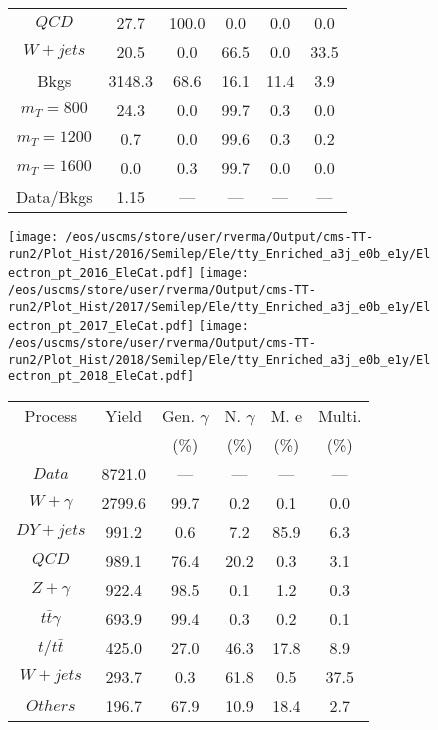 \begin{figure}
\begin{minipage}[c]{0.32\textwidth}
{\begin{tabular}{cccccc}
$ QCD $ &  27.7 &  100.0 &  0.0 &  0.0 &  0.0\\
$ W+jets $ &  20.5 &  0.0 &  66.5 &  0.0 &  33.5\\
Bkgs &  3148.3 &  68.6 &  16.1 &  11.4 &  3.9\\
$ m_{T} = 800 $ &  24.3 &  0.0 &  99.7 &  0.3 &  0.0\\
$ m_{T} = 1200 $ &  0.7 &  0.0 &  99.6 &  0.3 &  0.2\\
$ m_{T} = 1600 $ &  0.0 &  0.3 &  99.7 &  0.0 &  0.0\\
Data/Bkgs &  1.15 &  --- &  --- &  --- &  ---\\
\hline
\end{tabular}
}
\end{minipage}
\end{figure}

\begin{figure}
\centering
\texttt{[image: /eos/uscms/store/user/rverma/Output/cms-TT-run2/Plot\_Hist/2016/Semilep/Ele/tty\_Enriched\_a3j\_e0b\_e1y/Electron\_pt\_2016\_EleCat.pdf]}
\texttt{[image: /eos/uscms/store/user/rverma/Output/cms-TT-run2/Plot\_Hist/2017/Semilep/Ele/tty\_Enriched\_a3j\_e0b\_e1y/Electron\_pt\_2017\_EleCat.pdf]}
\texttt{[image: /eos/uscms/store/user/rverma/Output/cms-TT-run2/Plot\_Hist/2018/Semilep/Ele/tty\_Enriched\_a3j\_e0b\_e1y/Electron\_pt\_2018\_EleCat.pdf]}
\begin{minipage}[c]{0.32\textwidth}
\centering
\tiny{
\begin{tabular}{cccccc}
\hline
Process & Yield & Gen. $\gamma$ & N. $\gamma$ & M. e & Multi. \\
 &  & (\%) & (\%) & (\%) & (\%)  \\
\hline
                                                                      $ Data $ &  8721.0 &  --- &  --- &  --- &  ---\\
$ W+\gamma $ &  2799.6 &  99.7 &  0.2 &  0.1 &  0.0\\
$ DY+jets $ &  991.2 &  0.6 &  7.2 &  85.9 &  6.3\\
$ QCD $ &  989.1 &  76.4 &  20.2 &  0.3 &  3.1\\
$ Z+\gamma $ &  922.4 &  98.5 &  0.1 &  1.2 &  0.3\\
$ t\bar{t}\gamma $ &  693.9 &  99.4 &  0.3 &  0.2 &  0.1\\
$ t/t\bar{t} $ &  425.0 &  27.0 &  46.3 &  17.8 &  8.9\\
$ W+jets $ &  293.7 &  0.3 &  61.8 &  0.5 &  37.5\\
$ Others $ &  196.7 &  67.9 &  10.9 &  18.4 &  2.7\\

\end{tabular}}
\end{minipage}
\end{figure}
